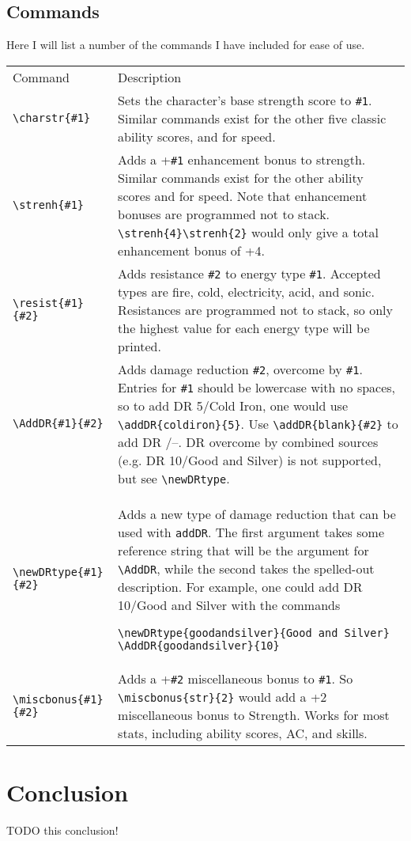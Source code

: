 \documentclass[oneside]{article}
\begin{document}
\subsection{Commands}
Here I will list a number of the commands I have included for ease of use.
\begin{tabular}{lp{8cm}}
Command & Description\\
\verb|\charstr{#1}| & Sets the character's base strength score to \verb|#1|. Similar commands exist for the other five classic ability scores, and for speed.\\
\verb|\strenh{#1}| & Adds a +\verb|#1| enhancement bonus to strength.  Similar commands exist for the other ability scores and for speed.  Note that enhancement bonuses are programmed not to stack.  \verb|\strenh{4}\strenh{2}| would only give a total enhancement bonus of +4.\\
\verb|\resist{#1}{#2}| & Adds resistance \verb|#2| to energy type \verb|#1|.  Accepted types are fire, cold, electricity, acid, and sonic.  Resistances are programmed not to stack, so only the highest value for each energy type will be printed.\\
\verb|\AddDR{#1}{#2}| & Adds damage reduction \verb|#2|, overcome by \verb|#1|. Entries for \verb|#1| should be lowercase with no spaces, so to add DR 5/Cold Iron, one would use \verb|\addDR{coldiron}{5}|.  Use \verb|\addDR{blank}{#2}| to add DR /--. DR overcome by combined sources (e.g. DR 10/Good and Silver) is not supported, but see \verb|\newDRtype|.\\
\verb|\newDRtype{#1}{#2}| & Adds a new type of damage reduction that can be used with \verb|addDR|. The first argument takes some reference string that will be the argument for \verb|\AddDR|, while the second takes the spelled-out description.  For example, one could add DR 10/Good and Silver with the commands
\begin{verbatim}
\newDRtype{goodandsilver}{Good and Silver}
\AddDR{goodandsilver}{10}
\end{verbatim}\\
\verb|\miscbonus{#1}{#2}| & Adds a +\verb|#2| miscellaneous bonus to \verb|#1|.  So \verb|\miscbonus{str}{2}| would add a +2 miscellaneous bonus to Strength. Works for most stats, including ability scores, AC, and skills.
\end{tabular}
\section{Conclusion}
\label{sec:conclusion}

TODO this conclusion!
\end{document}
